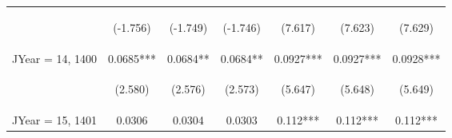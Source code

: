 \documentclass[]{article}
\begin{document}
\begin{center}
\begin{tabular}{lcccccc}
        \vspace{4pt}     & \begin{footnotesize}(-1.756)\end{footnotesize} & \begin{footnotesize}(-1.749)\end{footnotesize} & \begin{footnotesize}(-1.746)\end{footnotesize} & \begin{footnotesize}(7.617)\end{footnotesize}  & \begin{footnotesize}(7.623)\end{footnotesize}  & \begin{footnotesize}(7.629)\end{footnotesize}  \\
        JYear = 14, 1400 & 0.0685***                                      & 0.0684**                                       & 0.0684**                                       & 0.0927***                                      & 0.0927***                                      & 0.0928***                                      \\
        \vspace{4pt}     & \begin{footnotesize}(2.580)\end{footnotesize}  & \begin{footnotesize}(2.576)\end{footnotesize}  & \begin{footnotesize}(2.573)\end{footnotesize}  & \begin{footnotesize}(5.647)\end{footnotesize}  & \begin{footnotesize}(5.648)\end{footnotesize}  & \begin{footnotesize}(5.649)\end{footnotesize}  \\
        JYear = 15, 1401 & 0.0306                                         & 0.0304                                         & 0.0303                                         & 0.112***                                       & 0.112***                                       & 0.112***                                       \\

\end{tabular}
\end{center}
\end{document}
